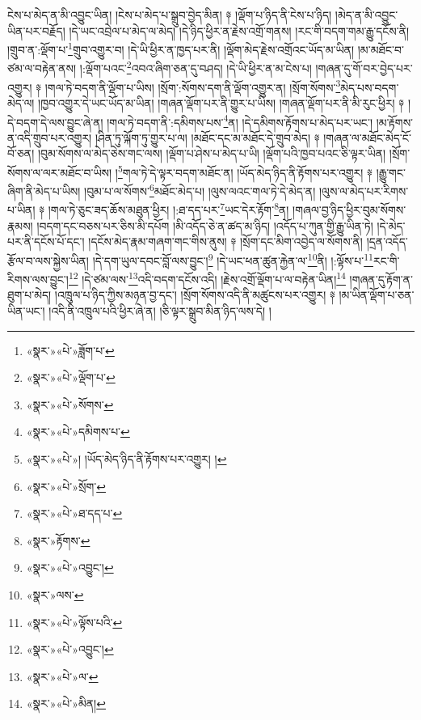 ངེས་པ་མེད་ན་མི་འབྱུང་ཡིན། །ངེས་པ་མེད་པ་སྒྲུབ་བྱེད་མིན། ༈ །ལྡོག་པ་ཉིད་ནི་ངེས་པ་ཉིད། །མེད་ན་མི་འབྱུང་ཡིན་པར་བརྗོད། །དེ་ཡང་འབྲེལ་པ་མེད་ལ་མེད། །དེ་ཉིད་ཕྱིར་ན་རྗེས་འགྲོ་གནས། །རང་གི་བདག་གམ་རྒྱུ་དངོས་ནི། །གྲུབ་ན་:ལྡོག་པ་\footnote{«སྣར་»«པེ་»ཟློག་པ་}གྲུབ་འགྱུར་བ། །དེ་ཡི་ཕྱིར་ན་ཁྱད་པར་ནི། །ལྡོག་མེད་རྗེས་འགྲོའང་ཡོད་མ་ཡིན། །མ་མཐོང་བ་ཙམ་ལ་བརྟེན་ནས། །:ལྡོག་པའང་\footnote{«སྣར་»«པེ་»ལྡོག་པ་}འབའ་ཞིག་ཅན་དུ་བཤད། །དེ་ཡི་ཕྱིར་ན་མ་ངེས་པ། །གཞན་དུ་གོ་བར་བྱེད་པར་འགྱུར། ༈ །གལ་ཏེ་བདག་ནི་ལྡོག་པ་ཡིས། །སྲོག་:སོགས་དག་ནི་ལྡོག་འགྱུར་ན། །སྲོག་སོགས་\footnote{«སྣར་»«པེ་»སོགས་}མེད་པས་བདག་མེད་ལ། །ཁྱབ་འགྱུར་དེ་ཡང་ཡོད་མ་ཡིན། །གཞན་ལྡོག་པར་ནི་གྱུར་པ་ཡིས། །གཞན་ལྡོག་པར་ནི་མི་རུང་ཕྱིར། ༈ །དེ་བདག་དེ་ལས་བྱུང་ཞེ་ན། །གལ་ཏེ་བདག་ནི་:དམིགས་པས་\footnote{«སྣར་»«པེ་»དམིགས་པ་}ན། །དེ་དམིགས་རྟོགས་པ་མེད་པར་ཡང་། །མ་རྟོགས་ན་འདི་གྲུབ་པར་འགྱུར། །ཤིན་ཏུ་ལྐོག་ཏུ་གྱུར་པ་ལ། །མཐོང་དང་མ་མཐོང་དེ་གྲུབ་མེད། ༈ །གཞན་ལ་མཐོང་མེད་ངོ་བོ་ཅན། །བུམ་སོགས་ལ་མེད་ཅེས་གང་ལས། །ལྡོག་པ་ཤེས་པ་མེད་པ་ཡི། །ལྡོག་པའི་ཁྱབ་པའང་ཅི་ལྟར་ཡིན། །སྲོག་སོགས་ལ་ལར་མཐོང་བ་ཡིས། །\footnote{«སྣར་»«པེ་»། །ཡོད་མེད་ཉིད་ནི་རྟོགས་པར་འགྱུར། །}གལ་ཏེ་དེ་ལྟར་བདག་མཐོང་ན། །ཡོད་མེད་ཉིད་ནི་རྟོགས་པར་འགྱུར། ༈ །རྒྱུ་གང་ཞིག་ནི་མེད་པ་ཡིས། །བུམ་པ་ལ་སོགས་\footnote{«སྣར་»«པེ་»སྲོག་}མཐོང་མེད་པ། །ལུས་ལའང་གལ་ཏེ་དེ་མེད་ན། །ལུས་ལ་མེད་པར་རིགས་པ་ཡིན། ༈ །གལ་ཏེ་ཅུང་ཟད་ཆོས་མཐུན་ཕྱིར། །:ཐ་དད་པར་\footnote{«སྣར་»«པེ་»ཐ་དད་པ་}ཡང་དེར་རྟོག་\footnote{«སྣར་»རྟོགས་}ན། །གཞལ་བྱ་ཉིད་ཕྱིར་བུམ་སོགས་རྣམས། །བདག་དང་བཅས་པར་ཅིས་མི་དཔོག །མི་འདོད་ཅེ་ན་ཚད་མ་ཉིད། །འདོད་པ་ཀུན་གྱི་རྒྱུ་ཡིན་ཏེ། །དེ་མེད་པར་ནི་དངོས་པོ་དང་། །དངོས་མེད་རྣམ་གཞག་གང་གིས་ནུས། ༈ །སྲོག་དང་མིག་འབྱེད་ལ་སོགས་ནི། །དྲན་འདོད་རྩོལ་བ་ལས་སྐྱེས་ཡིན། །དེ་དག་ཡུལ་དབང་བློ་ལས་བྱུང་།\footnote{«སྣར་»«པེ་»འབྱུང་།} །དེ་ཡང་ཕན་ཚུན་རྐྱེན་ལ་\footnote{«སྣར་»ལས་}ནི། །:ལྟོས་པ་\footnote{«སྣར་»«པེ་»ལྟོས་པའི་}རང་གི་རིགས་ལས་བྱུང་།\footnote{«སྣར་»«པེ་»འབྱུང་།} །དེ་ཙམ་ལས་\footnote{«སྣར་»«པེ་»ལ་}འདི་བདག་དངོས་འདི། །རྗེས་འགྲོ་ལྡོག་པ་ལ་བརྟེན་ཡིན།\footnote{«སྣར་»«པེ་»མིན།} །གཞན་དུ་རྟོག་ན་ཐུག་པ་མེད། །འཁྲུལ་པ་ཉིད་ཀྱིས་མཉན་བྱ་དང་། །སྲོག་སོགས་འདི་ནི་མཚུངས་པར་འགྱུར། ༈ །མ་ཡིན་ལྡོག་པ་ཅན་ཡིན་ཡང་། །འདི་ནི་འཁྲུལ་པའི་ཕྱིར་ཞེ་ན། །ཅི་ལྟར་སྒྲུབ་མིན་ཉིད་ལས་དེ། །
